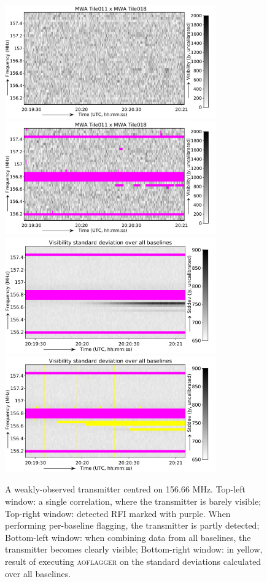 \documentclass{pasa}
\begin{document}
\noindent\begin{figure}%
\begin{center}
\includegraphics[width=9.1cm]{img/156_7_mhz_example}\includegraphics[width=9.1cm]{img/156_7_mhz_flagged}\\
\includegraphics[width=9.1cm]{img/156_7_mhz_stddev}\includegraphics[width=9.1cm]{img/156_7_mhz_stddev_flagged}
\caption{A weakly-observed transmitter centred on 156.66 MHz. Top-left window: a single correlation, where the transmitter is barely visible; Top-right window: detected RFI marked with purple. When performing per-baseline flagging, the transmitter is partly detected; Bottom-left window: when combining data from all baselines, the transmitter becomes clearly visible; Bottom-right window: in yellow, result of executing \textsc{aoflagger} on the standard deviations calculated over all baselines.}\label{fig:156_7}
\end{center}
\end{figure}
\end{document}
